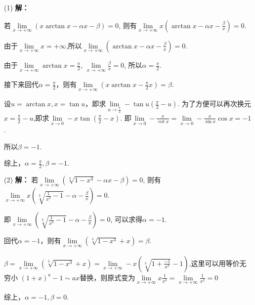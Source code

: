\documentclass[12pt , a4paper , oneside]{ctexart}
\begin{document}
            \begin{mdframed}
            (1) \textbf{解：}

            若$\lim\limits_{x \to +\infty} (x\arctan x - \alpha x - \beta) = 0$,
            则有$\lim\limits_{x \to +\infty} x(\arctan x - \alpha x - \frac{\beta}{x}) = 0$.

            由于$\lim\limits_{x \to +\infty} x = +\infty$,所以$\lim\limits_{x \to +\infty} (\arctan x - \alpha x - \frac{\beta}{x}) = 0$.

            由于$\lim\limits_{x \to +\infty} \arctan x = \frac{\pi}{2}$,
            $\lim\limits_{x \to +\infty} \frac{\beta}{x} = 0$,
            所以$\alpha = \frac{\pi}{2}$.

            接下来回代$\alpha = \frac{\pi}{2}$，则有$\lim\limits_{x \to +\infty} (x\arctan x - \frac{\pi}{2} x)=\beta$.

            设$u=\arctan x,x = \tan u$，即求$\lim\limits_{u \to \frac{\pi}{2}} - \tan u(\frac{\pi}{2} - u)$.
            为了方便可以再次换元$x = \frac{\pi}{2} - u$,即求$\lim\limits_{x \to 0} - x \tan(\frac{\pi}{2} - x)$.
            即$\lim\limits_{x \to 0} - \frac{x}{\cot x} = \lim\limits_{x \to 0} - \frac{x}{\sin x}\cos x = -1$.

            所以$\beta = -1$.
            
            综上，$\alpha = \frac{\pi}{2},\beta = -1$.
            \end{mdframed}
            
            \begin{mdframed}
            (2) \textbf{解：}
            若$\lim\limits_{x \to +\infty} (\sqrt[3]{1-x^{3}}-\alpha x - \beta) = 0$,
            则有$\lim\limits_{x \to +\infty} x (\sqrt[3]{ \frac{1}{x^3} - 1}-\alpha- \frac{\beta}{x}) = 0$.

            即$\lim\limits_{x \to +\infty} (\sqrt[3]{ \frac{1}{x^3} - 1}-\alpha- \frac{\beta}{x}) = 0$,
            可以求得$\alpha = -1$. 
            
            回代$\alpha = -1$，则有$\lim\limits_{x \to +\infty} (\sqrt[3]{1-x^{3}}+x)=\beta$.

            $\beta = \lim\limits_{x \to +\infty} (\sqrt[3]{1-x^{3}}+x) =
            \lim\limits_{x \to +\infty} -x (\sqrt[3]{ 1 + \frac{-1}{x^3} }-1)$,这里可以用等价无穷小
            $(1+x)^a -1 \sim ax$替换，则原式变为$\lim\limits_{x \to +\infty} x\frac{1}{x^3} = 
            \lim\limits_{x \to +\infty} \frac{1}{x^2} = 0$
            
            综上，$\alpha = -1,\beta = 0$.
            \end{mdframed}
\end{document}

